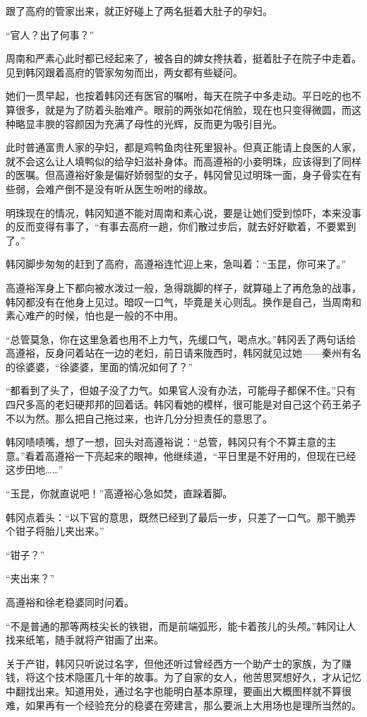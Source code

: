 跟了高府的管家出来，就正好碰上了两名挺着大肚子的孕妇。

“官人？出了何事？”

周南和严素心此时都已经起来了，被各自的婢女搀扶着，挺着肚子在院子中走着。见到韩冈跟着高府的管家匆匆而出，两女都有些疑问。

她们一贯早起，也按着韩冈还有医官的嘱咐，每天在院子中多走动。平日吃的也不算很多，就是为了防着头胎难产。眼前的两张如花俏脸，现在也只变得微圆，而这种略显丰腴的容颜因为充满了母性的光辉，反而更为吸引目光。

此时普通富贵人家的孕妇，都是鸡鸭鱼肉往死里狠补。但真正能请上良医的人家，就不会这么让人填鸭似的给孕妇滋补身体。而高遵裕的小妾明珠，应该得到了同样的医嘱。但高遵裕好象是偏好娇弱型的女子，韩冈曾见过明珠一面，身子骨实在有些弱，会难产倒不是没有听从医生吩咐的缘故。

明珠现在的情况，韩冈知道不能对周南和素心说，要是让她们受到惊吓，本来没事的反而变得有事了，“有事去高府一趟，你们散过步后，就去好好歇着，不要累到了。”

韩冈脚步匆匆的赶到了高府，高遵裕连忙迎上来，急叫着：“玉昆，你可来了。”

高遵裕浑身上下都向被水泼过一般，急得跳脚的样子，就算碰上了再危急的战事，韩冈都没有在他身上见过。暗叹一口气，毕竟是关心则乱。换作是自己，当周南和素心难产的时候，怕也是一般的不中用。

“总管莫急，你在这里急着也用不上力气，先缓口气，喝点水。”韩冈丢了两句话给高遵裕，反身问着站在一边的老妇，前日请来陇西时，韩冈就见过她——秦州有名的徐婆婆，“徐婆婆，里面的情况如何了？”

“都看到了头了，但娘子没了力气。如果官人没有办法，可能母子都保不住。”只有四尺多高的老妇硬邦邦的回着话。韩冈看她的模样，很可能是对自己这个药王弟子不以为然。那么把自己拖过来，也许几分分担责任的意思了。

韩冈啧啧嘴，想了一想，回头对高遵裕说：“总管，韩冈只有个不算主意的主意。”看着高遵裕一下亮起来的眼神，他继续道，“平日里是不好用的，但现在已经这步田地……”

“玉昆，你就直说吧！”高遵裕心急如焚，直跺着脚。

韩冈点着头：“以下官的意思，既然已经到了最后一步，只差了一口气。那干脆弄个钳子将胎儿夹出来。”

“钳子？”

“夹出来？”

高遵裕和徐老稳婆同时问着。

“不是普通的那等两枝尖长的铁钳，而是前端弧形，能卡着孩儿的头颅。”韩冈让人找来纸笔，随手就将产钳画了出来。

关于产钳，韩冈只听说过名字，但他还听过曾经西方一个助产士的家族，为了赚钱，将这个技术隐匿几十年的故事。为了自家的女人，他苦思冥想好久，才从记忆中翻找出来。知道用处，通过名字也能明白基本原理，要画出大概图样就不算很难，如果再有一个经验充分的稳婆在旁建言，那么要派上大用场也是理所当然的。

